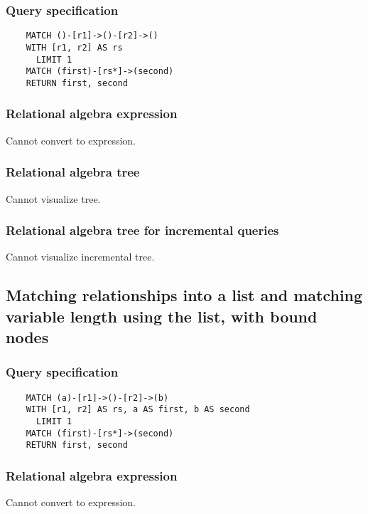 	\subsubsection*{Query specification}

	\begin{lstlisting}
	MATCH ()-[r1]->()-[r2]->()
	WITH [r1, r2] AS rs
	  LIMIT 1
	MATCH (first)-[rs*]->(second)
	RETURN first, second
	\end{lstlisting}


	\subsubsection*{Relational algebra expression}

	Cannot convert to expression.

	\subsubsection*{Relational algebra tree}

	Cannot visualize tree.

	\subsubsection*{Relational algebra tree for incremental queries}

	Cannot visualize incremental tree.
	\subsection{Matching relationships into a list and matching variable length using the list, with bound nodes}

	\subsubsection*{Query specification}

	\begin{lstlisting}
	MATCH (a)-[r1]->()-[r2]->(b)
	WITH [r1, r2] AS rs, a AS first, b AS second
	  LIMIT 1
	MATCH (first)-[rs*]->(second)
	RETURN first, second
	\end{lstlisting}


	\subsubsection*{Relational algebra expression}

	Cannot convert to expression.

